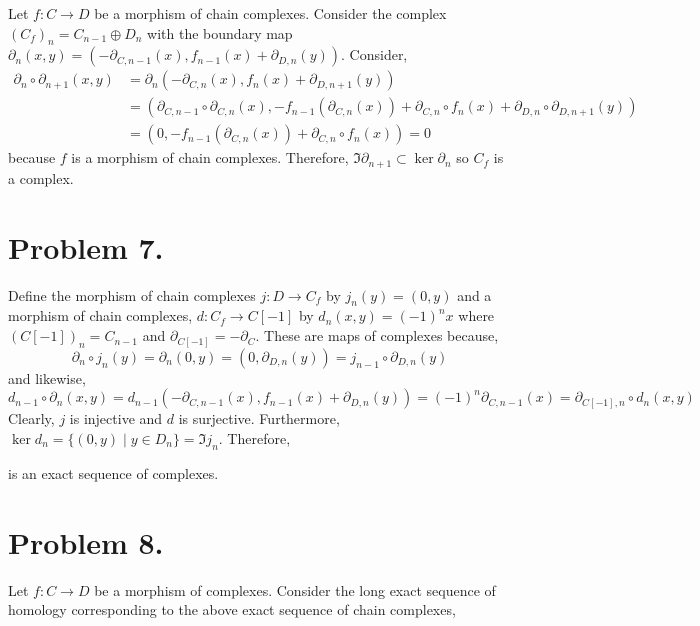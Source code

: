 \documentclass[12pt]{extarticle}
\begin{document}
Let $f : C \to D$ be a morphism of chain complexes. Consider the complex $(C_f)_n = C_{n-1} \oplus D_n$ with the boundary map $\partial_n(x,y) = (- \partial_{C, n-1}(x), f_{n-1}(x) + \partial_{D,n}(y))$. Consider,
\begin{align*}
\partial_{n} \circ \partial_{n+1}(x, y) & = \partial_n (- \partial_{C, n}(x), f_{n}(x) + \partial_{D,n+1}(y))
\\
& = (\partial_{C, n-1} \circ \partial_{C,n}(x), -f_{n-1}(\partial_{C,n}(x)) + \partial_{C,n} \circ f_{n}(x) + \partial_{D, n} \circ \partial_{D,n+1}(y))
\\
& = (0, -f_{n-1}(\partial_{C,n}(x)) + \partial_{C,n} \circ f_{n}(x) ) = 0
\end{align*}
because $f$ is a morphism of chain complexes. Therefore, $\Im{\partial_{n+1}} \subset \ker{\partial_n}$ so $C_f$ is a complex.

\section*{Problem 7.}

Define the morphism of chain complexes $j : D \to C_f$ by $j_n(y) = (0, y)$ and a morphism of chain complexes, $d : C_f \to C[-1]$ by $d_n(x, y) = (-1)^n x $ where $(C[-1])_n = C_{n-1}$ and $\partial_{C[-1]} = - \partial_C$. These are maps of complexes because,
\[ \partial_n \circ j_n(y) = \partial_n(0, y) = (0, \partial_{D, n}(y)) = j_{n-1} \circ \partial_{D,n}(y) \]
and likewise,
\[ d_{n-1} \circ \partial_n(x,y) = d_{n-1}(-\partial_{C, n-1} (x), f_{n-1}(x) + \partial_{D, n}(y)) = (-1)^{n} \partial_{C,n-1} (x) = \partial_{C[-1], n} \circ d_{n}(x, y) \]
Clearly, $j$ is injective and $d$ is surjective. Furthermore, $\ker{d_n} = \{ (0, y) \mid y \in D_n \} = \Im{j_n}$. Therefore, 
\begin{center}
\end{center}
is an exact sequence of complexes.

\section*{Problem 8.}

Let $f : C \to D$ be a morphism of complexes. Consider the long exact sequence of homology corresponding to the above exact sequence of chain complexes,
\end{document}
